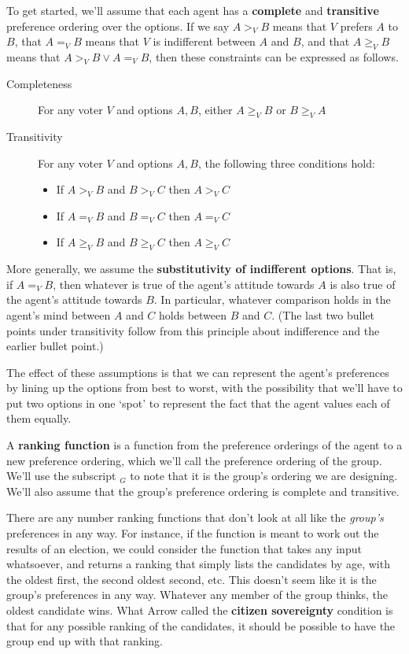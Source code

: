 \documentclass[openany]{book}
\begin{document}
To get started, we'll assume that each agent has a \textbf{complete} and \textbf{transitive} preference ordering over the options. If we say $A >_V B$ means that $V$ prefers $A$ to $B$, that $A =_V B$ means that $V$ is indifferent between $A$ and $B$, and that $A \geq_V B$ means that $A >_V B \vee A =_V B$, then these constraints can be expressed as follows.

\begin{description}
\item[Completeness] For any voter $V$ and options $A, B$, either $A \geq_V B$ or $B \geq_V A$
\item[Transitivity] For any voter $V$ and options $A, B$, the following three conditions hold:
	\begin{itemize}
	\item If $A >_V B$ and $B >_V C$ then $A >_V C$
	\item If $A =_V B$ and $B =_V C$ then $A =_V C$
	\item If $A \geq_V B$ and $B \geq_V C$ then $A \geq_V C$
	\end{itemize}
\end{description}
More generally, we assume the \textbf{substitutivity of indifferent options}. That is, if $A =_V B$, then whatever is true of the agent's attitude towards $A$ is also true of the agent's attitude towards $B$. In particular, whatever comparison holds in the agent's mind between $A$ and $C$ holds between $B$ and $C$. (The last two bullet points under transitivity follow from this principle about indifference and the earlier bullet point.)

The effect of these assumptions is that we can represent the agent's preferences by lining up the options from best to worst, with the possibility that we'll have to put two options in one `spot' to represent the fact that the agent values each of them equally.

A \textbf{ranking function} is a function from the preference orderings of the agent to a new preference ordering, which we'll call the preference ordering of the group. We'll use the subscript $_G$ to note that it is the group's ordering we are designing. We'll also assume that the group's preference ordering is complete and transitive. 

There are any number ranking functions that don't look at all like the \textit{group's} preferences in any way. For instance, if the function is meant to work out the results of an election, we could consider the function that takes any input whatsoever, and returns a ranking that simply lists the candidates by age, with the oldest first, the second oldest second, etc. This doesn't seem like it is the group's preferences in any way. Whatever any member of the group thinks, the oldest candidate wins. What Arrow called the \textbf{citizen sovereignty} condition is that for any possible ranking of the candidates, it should be possible to have the group end up with that ranking.
\end{document}
